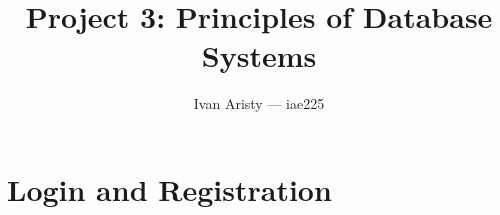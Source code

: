 \documentclass{article}
\title{Project 3: Principles of Database Systems}
\author{Ivan Aristy — iae225}
\begin{document}
  \maketitle %
  \thispagestyle{empty}
  \vspace{+5pt}

\section{Login and Registration}
\label{sec:intro}




\begin{refcontext}[sorting=nyt]
\printbibliography
\end{refcontext}
\end{document}

